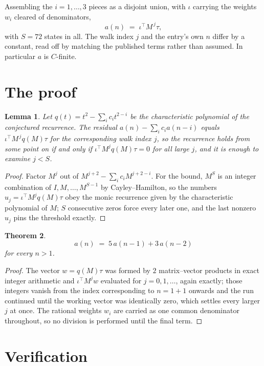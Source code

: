 \documentclass[11pt,a4paper]{article}
\theoremstyle{plain}
\newtheorem{theorem}{Theorem}
\newtheorem{lemma}[theorem]{Lemma}
\theoremstyle{definition}
\begin{document}
Assembling the $i=1,\dots,3$ pieces as a disjoint union, with $\iota$ carrying the weights
$w_i$ cleared of denominators,
\[
a(n)\;=\;\iota^{\!\top}M^{\,j}\tau ,
\]
with $S=72$ states in all. The walk index $j$ and the entry's own $n$ differ by a constant,
read off by matching the published terms rather than assumed. In particular $a$ is $C$-finite.

\section{The proof}

\begin{lemma}\label{lem:crit}
Let $q(t)=t^{2}-\sum_i c_it^{2-i}$ be the characteristic polynomial of the
conjectured recurrence. The residual $a(n)-\sum_ic_ia(n-i)$ equals
$\iota^{\!\top}M^{\,j}q(M)\tau$ for the corresponding walk index $j$, so the recurrence
holds from some point on if and only if $\iota^{\!\top}M^{j}q(M)\tau=0$ for all large $j$,
and it is enough to examine $j<S$.
\end{lemma}

\begin{proof}
Factor $M^{j}$ out of $M^{j+2}-\sum_ic_iM^{j+2-i}$. For the bound, $M^{S}$
is an integer combination of $I,M,\dots,M^{S-1}$ by Cayley--Hamilton, so the numbers
$u_j=\iota^{\!\top}M^{j}q(M)\tau$ obey the monic recurrence given by the characteristic
polynomial of $M$; $S$ consecutive zeros force every later one, and the last nonzero $u_j$
pins the threshold exactly.
\end{proof}

\begin{theorem}
\[
a(n)\;=\;5\,a(n-1) + 3\,a(n-2)
\]
for every $n>1$.
\end{theorem}

\begin{proof}
The vector $w=q(M)\tau$ was formed by $2$ matrix--vector products in exact integer
arithmetic and $\iota^{\!\top}M^{j}w$ evaluated for $j=0,1,\dots$, again exactly; those
integers vanish from the index corresponding to $n=1+1$ onwards and the run continued
until the working vector was identically zero, which settles every larger $j$ at once. The
rational weights $w_i$ are carried as one common denominator throughout, so no division is
performed until the final term.
\end{proof}

\section{Verification}
\end{document}
